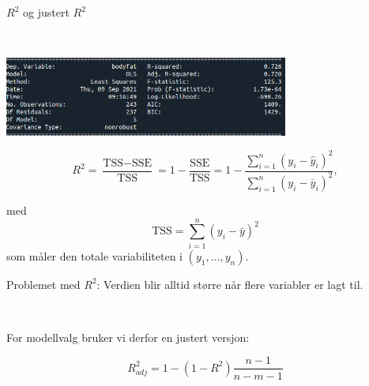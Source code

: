 \documentclass[10pt,ignorenonframetext,]{beamer}
\begin{document}
\begin{frame}

\begin{block}{\(R^2\) og justert \(R^2\)}

\(~\)

\includegraphics[width=0.7\textwidth,height=\textheight]{ols_result_all_header.png}

\[R^2 = \frac{\text{TSS}-\text{SSE}}{\text{TSS}}= 1-\frac{\text{SSE}}{\text{TSS}}=1-\frac{\sum_{i=1}^n(y_i-\hat{y}_i)^2}{\sum_{i=1}^n(y_i-\bar{y}_i)^2}, \]

med \[\text{TSS} = \sum_{i=1}^n (y_i - \bar{y})^2\] som måler den totale
variabiliteten i \((y_1,\ldots , y_n)\).

\vspace{2mm}

\end{block}

\end{frame}

\begin{frame}

Problemet med \(R^2\): Verdien blir alltid større når flere variabler er
lagt til.

\(~\)

For modellvalg bruker vi derfor en justert versjon:

\[R^2_{adj} = 1-(1-R^2 )\frac{n-1}{n-m-1}\]

\end{frame}
\end{document}
